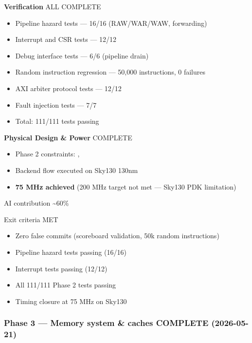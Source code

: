 \begin{record}
\textbf{Verification} \ok{} ALL COMPLETE

\begin{itemize}
\tightlist
\item
  \ok{} Pipeline hazard tests --- 16/16
  (RAW/\allowbreak{}WAR/\allowbreak{}WAW, forwarding)
\item
  \ok{} Interrupt and CSR tests --- 12/12
\item
  \ok{} Debug interface tests --- 6/6 (pipeline drain)
\item
  \ok{} Random instruction regression --- 50,000 instructions, 0
  failures
\item
  \ok{} AXI arbiter protocol tests --- 12/12
\item
  \ok{} Fault injection tests --- 7/7
\item
  \ok{} Total: 111/111 tests passing
\end{itemize}

\textbf{Physical Design \& Power} \ok{} COMPLETE

\begin{itemize}
\tightlist
\item
  \ok{} Phase 2 constraints: ,
\item
  \ok{} Backend flow executed on Sky130 130nm
\item
  \ok{} \textbf{75 MHz achieved} (200 MHz target not met --- Sky130 PDK
  limitation)
\end{itemize}

\notemark{} AI contribution \textasciitilde60\%

\ok{} Exit criteria MET

\begin{itemize}
\tightlist
\item
  \ok{} Zero false commits (scoreboard validation, 50k random
  instructions)
\item
  \ok{} Pipeline hazard tests passing (16/16)
\item
  \ok{} Interrupt tests passing (12/12)
\item
  \ok{} All 111/111 Phase 2 tests passing
\item
  \ok{} Timing closure at 75 MHz on Sky130
\end{itemize}

\end{record}

\subsubsection{\texorpdfstring{Phase 3 --- Memory system \& caches \ok{}
COMPLETE
(2026-05-21)}{Phase 3 --- Memory system \& caches  COMPLETE (2026-05-21)}}\label{cr:status:roadmap:phase-3-memory-system-caches-white-check-mark-complete-2026-05-21}

